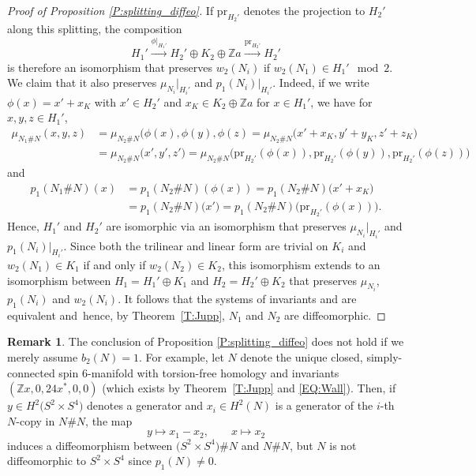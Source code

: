 \documentclass[10pt,a4paper]{amsart}
\numberwithin{equation}{section}
\theoremstyle{definition}
\newtheorem{Remark}[Theorem]{Remark}
\numberwithin{table}{section}
\newcommand{\Z}{\mathbb{Z}}
\begin{document}
\begin{proof}[Proof of Proposition \ref{P:splitting_diffeo}]
	If $\mathrm{pr}_{H_2'}$ denotes the projection to $H_2'$ along this splitting, the composition
	\[ H_1'\xrightarrow{\phi|_{H_1'}}H_2'\oplus K_2\oplus\Z a\xrightarrow{\mathrm{pr}_{H_2'}}H_2' \]
	is therefore an isomorphism that preserves $w_2(N_i)$ if $w_2(N_1)\in H_1'\mod 2$. We claim that it also preserves $\mu_{N_i}|_{H_i'}$ and $p_1(N_i)|_{H_i'}$. Indeed, if we write $\phi(x)=x'+x_K$ with $x'\in H_2'$ and $x_K\in K_2\oplus\Z a$ for $x\in H_1'$, we have for $x,y,z\in H_1'$,
	\begin{align*}
		\mu_{N_1\# N}(x,y,z)&=\mu_{N_2\# N}(\phi(x),\phi(y),\phi(z)
		=\mu_{N_2\# N}\bigl(x'+x_K,y'+y_K,z'+z_K\bigr)\\
		&=\mu_{N_2\# N}\bigl(x',y',z'\bigr)
		=\mu_{N_2\# N}\bigl(\mathrm{pr}_{H_2'}(\phi(x)),\mathrm{pr}_{H_2'}(\phi(y)),\mathrm{pr}_{H_2'}(\phi(z))\bigr)
	\end{align*}
	and
	\begin{align*}
		p_1(N_1\# N)(x)&=p_1(N_2\# N)(\phi(x))
        =p_1(N_2\# N)\bigl(x'+x_K\bigr)\\
        &=p_1(N_2\# N)\bigl(x'\bigr)
        =p_1(N_2\# N)\bigl(\mathrm{pr}_{H_2'}(\phi(x))\bigr).
	\end{align*}
Hence, $H_1'$ and $H_2'$ are isomorphic via an isomorphism that preserves $\mu_{N_i}|_{H_i'}$ and $p_1(N_i)|_{H_i'}$. Since both the trilinear and linear form are trivial on $K_i$ and $w_2(N_1)\in K_1$ if and only if $w_2(N_2)\in K_2$, this isomorphism extends to an isomorphism between $H_1=H_1'\oplus K_1$ and ${H_2=H_2'\oplus K_2}$ that preserves $\mu_{N_i}$, $p_1(N_i)$ and $w_2(N_i)$. It follows that the systems of invariants  and  are equivalent and~hence, by Theorem~\ref{T:Jupp}, $N_1$ and $N_2$ are diffeomorphic.
\end{proof}

\begin{Remark}
	The conclusion of Proposition \ref{P:splitting_diffeo} does not hold if we merely assume $b_2(N)=1$. For example, let $N$ denote the unique closed, simply-connected spin $6$-manifold with torsion-free homology and invariants $(\Z x,0,24x^*,0,0)$ (which exists by Theorem~\ref{T:Jupp} and \eqref{EQ:Wall}). Then, if $y\in H^2\bigl(S^2\times S^4\bigr)$ denotes a generator and $x_i\in H^2(N)$ is a generator of the $i$-th $N$-copy in $N\# N$, the map
	\[ y\mapsto x_1-x_2,\qquad x\mapsto x_2 \]
	induces a diffeomorphism between $\bigl(S^2\times S^4\bigr)\# N$ and $N\#N$, but $N$ is not diffeomorphic to $S^2\times S^4$ since $p_1(N)\neq 0$.
\end{Remark}
\end{document}
